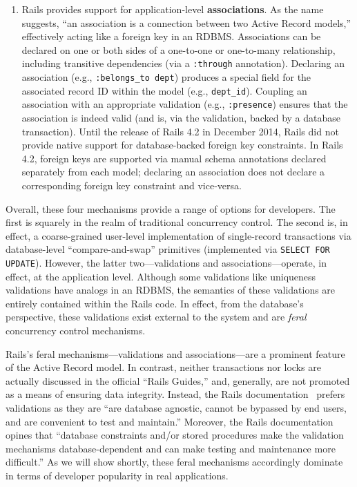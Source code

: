 \begin{enumerate}
\item Rails provides support for application-level
  \textbf{associations}. As the name suggests, ``an association is a
  connection between two Active Record models,'' effectively acting
  like a foreign key in an RDBMS. Associations can be declared on one
  or both sides of a one-to-one or one-to-many relationship, including
  transitive dependencies (via a \texttt{:through}
  annotation). Declaring an association (e.g., \texttt{:belongs\_to
    dept}) produces a special field for the associated record ID
  within the model (e.g., \texttt{dept\_id}). Coupling an association
  with an appropriate validation (e.g., \texttt{:presence}) ensures
  that the association is indeed valid (and is, via the validation,
  backed by a database transaction). Until the release of Rails 4.2 in
  December 2014, Rails did not provide native support for
  database-backed foreign key constraints. In Rails 4.2, foreign keys
  are supported via manual schema annotations declared separately from
  each model; declaring an association does not declare a
  corresponding foreign key constraint and vice-versa.
\end{enumerate}

Overall, these four mechanisms provide a range of options for
developers. The first is squarely in the realm of traditional
concurrency control. The second is, in effect, a coarse-grained
user-level implementation of single-record transactions via
database-level ``compare-and-swap'' primitives (implemented via
\texttt{SELECT FOR UPDATE}). However, the latter two---validations and
associations---operate, in effect, at the application level. Although
some validations like uniqueness validations have analogs in an RDBMS,
the semantics of these validations are entirely contained within the
Rails code. In effect, from the database's perspective, these
validations exist external to the system and are \textit{feral}
concurrency control mechanisms.

Rails's feral mechanisms---validations and associations---are a
prominent feature of the Active Record model. In contrast, neither
transactions nor locks are actually discussed in the official ``Rails
Guides,'' and, generally, are not promoted as a means of ensuring data
integrity. Instead, the Rails documentation~\cite{rails-guide} prefers
validations as they are ``are database agnostic, cannot be bypassed by
end users, and are convenient to test and maintain.'' Moreover, the
Rails documentation opines that ``database constraints and/or stored
procedures make the validation mechanisms database-dependent and can
make testing and maintenance more difficult.''  As we will show
shortly, these feral mechanisms accordingly dominate in terms of
developer popularity in real applications.

